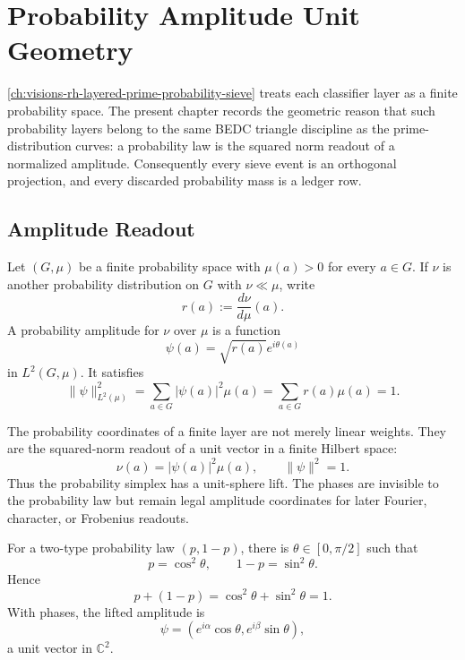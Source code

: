 \chapter{Probability Amplitude Unit Geometry}
\label{ch:visions-rh-probability-amplitude-unit-geometry}

\autoref{ch:visions-rh-layered-prime-probability-sieve} treats each
classifier layer as a finite probability space.  The present chapter
records the geometric reason that such probability layers belong to the
same BEDC triangle discipline as the prime-distribution curves: a
probability law is the squared norm readout of a normalized amplitude.
Consequently every sieve event is an orthogonal projection, and every
discarded probability mass is a ledger row.

\section{Amplitude Readout}
\label{sec:rh-probability-amplitude-readout}

\begin{definition}
\label{def:rh-finite-probability-amplitude}
Let $(G,\mu)$ be a finite probability space with $\mu(a)>0$ for every
$a\in G$.  If $\nu$ is another probability distribution on $G$ with
$\nu\ll\mu$, write
$$
r(a):=\frac{d\nu}{d\mu}(a).
$$
A probability amplitude for $\nu$ over $\mu$ is a function
$$
\psi(a)=\sqrt{r(a)}e^{i\theta(a)}
$$
in $L^2(G,\mu)$.  It satisfies
$$
\|\psi\|_{L^2(\mu)}^2
=
\sum_{a\in G}|\psi(a)|^2\mu(a)
=
\sum_{a\in G}r(a)\mu(a)
=
1.
$$
\end{definition}

\begin{principle}
\label{prin:rh-probability-squared-amplitude-readout}
The probability coordinates of a finite layer are not merely linear
weights.  They are the squared-norm readout of a unit vector in a finite
Hilbert space:
$$
\nu(a)=|\psi(a)|^2\mu(a),
\qquad
\|\psi\|^2=1.
$$
Thus the probability simplex has a unit-sphere lift.  The phases are
invisible to the probability law but remain legal amplitude coordinates
for later Fourier, character, or Frobenius readouts.
\end{principle}

\begin{corollary}
\label{cor:rh-binary-probability-unit-circle-readout}
For a two-type probability law $(p,1-p)$, there is
$\theta\in[0,\pi/2]$ such that
$$
p=\cos^2\theta,
\qquad
1-p=\sin^2\theta.
$$
Hence
$$
p+(1-p)=\cos^2\theta+\sin^2\theta=1.
$$
With phases, the lifted amplitude is
$$
\psi=(e^{i\alpha}\cos\theta,e^{i\beta}\sin\theta),
$$
a unit vector in $\mathbb C^2$.
\end{corollary}

